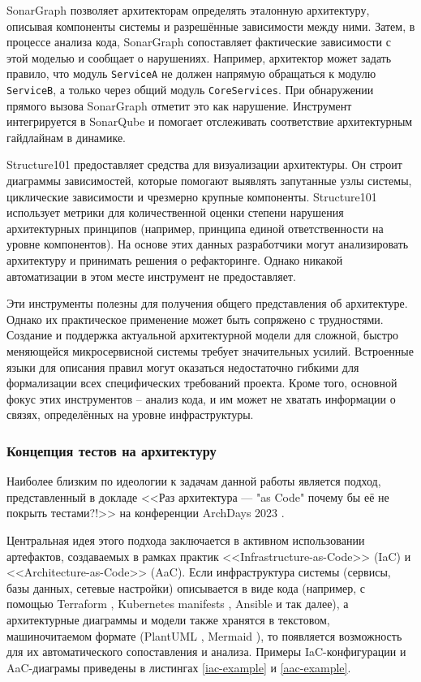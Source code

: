 SonarGraph позволяет архитекторам определять эталонную архитектуру, описывая компоненты системы и разрешённые зависимости между ними. Затем, в процессе анализа кода, SonarGraph сопоставляет фактические зависимости с этой моделью и сообщает о нарушениях. Например, архитектор может задать правило, что модуль \verb|ServiceA| не должен напрямую обращаться к модулю \verb|ServiceB|, а только через общий модуль \verb|CoreServices|. При обнаружении прямого вызова SonarGraph отметит это как нарушение. Инструмент интегрируется в SonarQube и помогает отслеживать соответствие архитектурным гайдлайнам в динамике.

Structure101 предоставляет средства для визуализации архитектуры. Он строит диаграммы зависимостей, которые помогают выявлять запутанные узлы системы, циклические зависимости и чрезмерно крупные компоненты. Structure101 использует метрики для количественной оценки степени нарушения архитектурных принципов (например, принципа единой ответственности на уровне компонентов). На основе этих данных разработчики могут анализировать архитектуру и принимать решения о рефакторинге. Однако никакой автоматизации в этом месте инструмент не предоставляет.

Эти инструменты полезны для получения общего представления об архитектуре. Однако их практическое применение может быть сопряжено с трудностями. Создание и поддержка актуальной архитектурной модели для сложной, быстро меняющейся микросервисной системы требует значительных усилий. Встроенные языки для описания правил могут оказаться недостаточно гибкими для формализации всех специфических требований проекта. Кроме того, основной фокус этих инструментов – анализ кода, и им может не хватать информации о связях, определённых на уровне инфраструктуры.

\subsubsection{Концепция тестов на архитектуру}

Наиболее близким по идеологии к задачам данной работы является подход, представленный в докладе <<Раз архитектура — "as Code"\text{,} почему бы её не покрыть тестами?!>> на конференции ArchDays 2023 \cite{archdays-talk-aac}.

Центральная идея этого подхода заключается в активном использовании артефактов, создаваемых в рамках практик <<Infrastructure-as-Code>> (IaC) и <<Architecture-as-Code>> (AaC). Если инфраструктура системы (сервисы, базы данных, сетевые настройки) описывается в виде кода (например, с помощью Terraform \cite{terraform}, Kubernetes manifests \cite{k8s-manifests}, Ansible \cite{ansible} и так далее), а архитектурные диаграммы и модели также хранятся в текстовом, машиночитаемом формате (PlantUML \cite{plantuml-tool}, Mermaid \cite{mermaid-tool}), то появляется возможность для их автоматического сопоставления и анализа. Примеры IaC-конфигурации и AaC-диаграмы приведены в листингах \ref{iac-example} и \ref{aac-example}.

